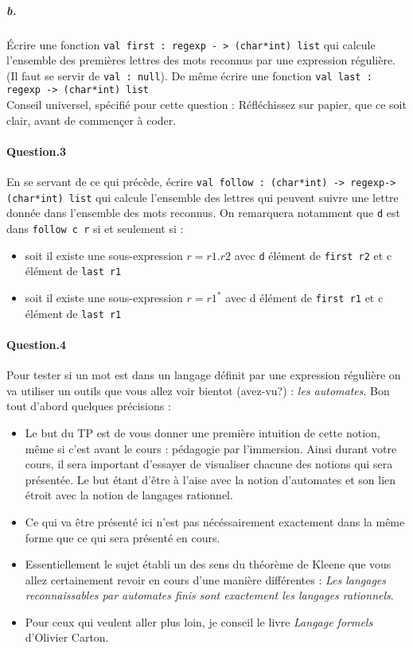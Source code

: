 \documentclass[10pt,a4paper]{article}
\begin{document}
\subparagraph{b.}
Écrire une fonction \texttt{val first : regexp - >  (char*int) list}
qui calcule l'ensemble des premières lettres des mots reconnus par une
expression régulière. (Il faut se servir de \texttt{val : null}).
De même écrire une fonction \texttt{val last : regexp -> (char*int) list} 
\\ Conseil universel, spécifié pour cette question : Réfléchissez sur papier,
que ce soit clair, avant de commençer à coder.

\paragraph{Question.3\\}
En se servant de ce qui précède, écrire \texttt{val follow : (char*int) ->
regexp-> (char*int) list} qui calcule l'ensemble des lettres qui peuvent suivre
une lettre donnée dans l'ensemble des mots reconnus.
On remarquera notamment que \texttt{d} est dans \texttt{follow c r} si et
seulement si :
\begin{itemize}
\item soit il existe une sous-expression $r=r1.r2$ avec \texttt{d} élément de
\texttt{first r2} et c élément de \texttt{last r1}
\item soit il existe une sous-expression $r=r1^{*}$ avec d élément de
\texttt{first r1}  et c élément de \texttt{last r1} 
\end{itemize}

\paragraph{Question.4\\}
Pour tester si un mot est dans un langage définit par une expression régulière
on va utiliser un outils que vous allez voir bientot (avez-vu?) : \emph{les
automates}. Bon tout d'abord quelques précisions :
\begin{itemize}
\item Le but du TP est de vous donner une première intuition de cette notion,
même si c'est avant le cours : pédagogie par l'immersion. Ainsi durant votre cours,
il sera important d'essayer de visualiser chacune des notions qui sera
présentée. Le but étant d'être à l'aise avec la notion d'automates et son lien
étroit avec la notion de langages rationnel.
\item Ce qui va être présenté ici n'est pas nécéssairement exactement dans la
même forme que ce qui sera présenté en cours.
\item Essentiellement le sujet établi un des sens du théorème de Kleene que vous
allez certainement revoir en cours d'une manière différentes : \emph{Les
langages reconnaissables par automates finis sont exactement les langages
rationnels}.
\item Pour ceux qui veulent aller plus loin, je conseil le livre \emph{Langage formels} d'Olivier
Carton. 
\end{itemize} 
\end{document}
